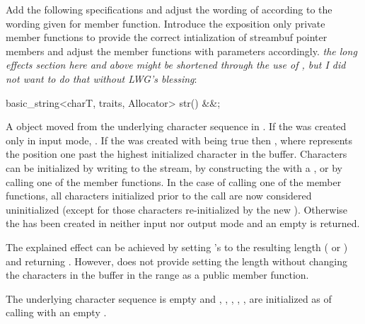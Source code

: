 \documentclass[ebook,11pt,article]{memoir}
\begin{document}
Add the following specifications and adjust the wording of  according to the wording given for  member function. Introduce the exposition only private member functions  to provide the correct intialization of streambuf pointer members and adjust the  member functions with parameters accordingly. \emph{the long effects section here and above might be shortened through the use of , but I did not want to do that without LWG's blessing}:

\begin{insrt}
\begin{itemdecl}
basic_string<charT, traits, Allocator> str() &&;
\end{itemdecl}
\begin{itemdescr}

\pnum
\returns A  object moved from 
the  underlying character sequence
in . 
If the  was created only in input mode, 
. 
If the  was created with  being true 
then , 
where  represents the position one past the highest initialized character in the buffer. 
Characters can be initialized by writing to the stream, 
by constructing the  with a , 
or by calling one of the  member functions. 
In the case of calling one of the  member functions, 
all characters initialized prior to the call are now considered uninitialized 
(except for those characters re-initialized by the new ). 
Otherwise the  has been created in neither input nor output mode 
and an empty  is returned. 

\pnum
\begin{note}
The explained effect can be achieved by setting 's  to the resulting length ( or ) and returning . However,  does not provide setting the length without changing the characters in the buffer in the range \tcode{[buf.data()+buf.size(), buf.data()+buf.capacity())} as a public member function.
\end{note}

\pnum
\ensures The underlying character sequence  is empty and , , , , ,  are initialized as of calling  with an empty .


\end{itemdescr}
\end{insrt}
\end{document}
